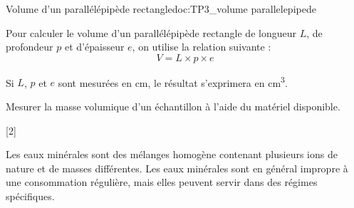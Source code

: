 \begin{doc}{Volume d'un parallélépipède rectangle}{doc:TP3_volume parallelepipede}
  \begin{multicols}{2}
    Pour calculer le volume d'un parallélépipède rectangle de longueur $L$, de profondeur $p$ et d’épaisseur $e$, on utilise la relation suivante :
    \begin{equation*}
      V = L \times p \times e
    \end{equation*}

    \centering
  \end{multicols}
  Si $L$, $p$ et $e$ sont mesurées en \unit{\cm},
  le résultat s’exprimera en \unit{\cubic\cm}.
\end{doc}

\mesure Mesurer la masse volumique d'un échantillon à l'aide du matériel disponible.

[2]



\begin{importants}
  Les eaux minérales sont des mélanges homogène contenant plusieurs ions de nature et de masses différentes.
  Les eaux minérales sont en général impropre à une consommation régulière, mais elles peuvent servir dans des régimes spécifiques.
  
  \hspace{8pt} 
\end{importants}



